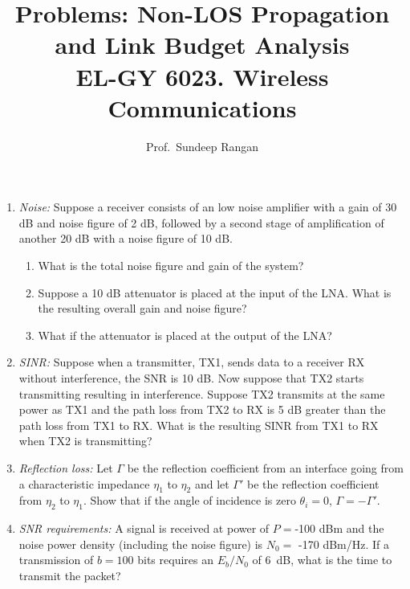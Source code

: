 \documentclass[11pt]{article}
\begin{document}
\title{Problems:  Non-LOS Propagation and Link Budget Analysis\\
EL-GY 6023. Wireless Communications}
\author{Prof.\ Sundeep Rangan}
\date{}

\maketitle

\begin{enumerate}

\item \emph{Noise:}
Suppose a receiver consists of an low noise amplifier with a gain of 30 dB
and noise figure of 2 dB, followed by a second stage of amplification of
another 20 dB with a noise figure of 10 dB.
\begin{enumerate}[label=(\alph*)]
\item What is the total noise figure and gain of the system?
\item Suppose a 10 dB attenuator is placed at the input of the LNA.
What is the resulting overall gain and noise figure?
\item What if the attenuator is placed at the output of the LNA?
\end{enumerate}

\item \emph{SINR:} 
Suppose when a transmitter, TX1, sends data to a receiver RX
without interference, the SNR is 10 dB.  Now suppose that TX2
starts transmitting resulting in interference.
Suppose TX2 transmits at the same power as TX1 and the path loss from
TX2 to RX is 5 dB greater than the path loss from TX1 to RX.
What is the resulting SINR from TX1 to RX when TX2 is transmitting?


\item \emph{Reflection loss:}  Let $\Gamma$ be the reflection coefficient from
an interface going from a characteristic impedance $\eta_1$ to $\eta_2$ and let 
$\Gamma'$ be the reflection coefficient from
 $\eta_2$ to $\eta_1$.  Show that if the angle of incidence is
zero $\theta_i=0$, $\Gamma = -\Gamma'$.  


\item \emph{SNR requirements:} 
A signal is received at power of $P = $-100 dBm and the noise power density
(including the noise figure) is $N_0 = $ -170 dBm/Hz.
If a transmission of $b=100$ bits requires an $E_b/N_0$
of 6~dB, what is the time to transmit the packet?


\end{enumerate}
\end{document}

